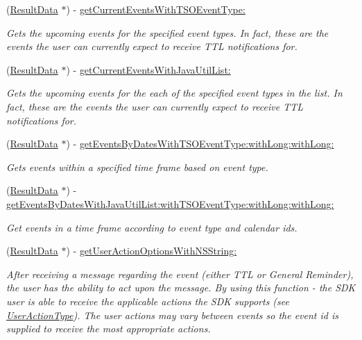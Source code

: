 \begin{DoxyCompactItemize}
(\hyperlink{interface_result_data}{Result\+Data} $\ast$) -\/ \hyperlink{protocol_i_events_engine-p_a64c44d39aebe0a33584852b3c856fc79}{get\+Current\+Events\+With\+T\+S\+O\+Event\+Type\+:}
\begin{DoxyCompactList}\small\item\em Gets the upcoming events for the specified event types. In fact, these are the events the user can currently expect to receive T\+T\+L notifications for. \end{DoxyCompactList}\item 
(\hyperlink{interface_result_data}{Result\+Data} $\ast$) -\/ \hyperlink{protocol_i_events_engine-p_a31957154081f1974edcf5e9f4234135f}{get\+Current\+Events\+With\+Java\+Util\+List\+:}
\begin{DoxyCompactList}\small\item\em Gets the upcoming events for the each of the specified event types in the list. In fact, these are the events the user can currently expect to receive T\+T\+L notifications for. \end{DoxyCompactList}\item 
(\hyperlink{interface_result_data}{Result\+Data} $\ast$) -\/ \hyperlink{protocol_i_events_engine-p_a6d07f026cea5734958864be7cfa96d46}{get\+Events\+By\+Dates\+With\+T\+S\+O\+Event\+Type\+:with\+Long\+:with\+Long\+:}
\begin{DoxyCompactList}\small\item\em Gets events within a specified time frame based on event type. \end{DoxyCompactList}\item 
(\hyperlink{interface_result_data}{Result\+Data} $\ast$) -\/ \hyperlink{protocol_i_events_engine-p_a92e315ac5f6ebf5e57550f7245a2c21b}{get\+Events\+By\+Dates\+With\+Java\+Util\+List\+:with\+T\+S\+O\+Event\+Type\+:with\+Long\+:with\+Long\+:}
\begin{DoxyCompactList}\small\item\em Get events in a time frame according to event type and calendar ids. \end{DoxyCompactList}\item 
(\hyperlink{interface_result_data}{Result\+Data} $\ast$) -\/ \hyperlink{protocol_i_events_engine-p_a01dd8f029b96f978f1fd59c242b68b1e}{get\+User\+Action\+Options\+With\+N\+S\+String\+:}
\begin{DoxyCompactList}\small\item\em After receiving a message regarding the event (either T\+T\+L or General Reminder), the user has the ability to act upon the message. By using this function -\/ the S\+D\+K user is able to receive the applicable actions the S\+D\+K supports (see \hyperlink{interface_user_action_type}{User\+Action\+Type}). The user actions may vary between events so the event id is supplied to receive the most appropriate actions. \end{DoxyCompactList}\item 

\end{DoxyCompactItemize}
